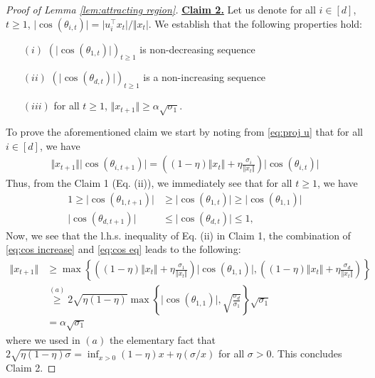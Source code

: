 \begin{proof}[Proof of Lemma \ref{lem:attracting region}]
\underline{\textbf{Claim 2.}} Let us denote for all $i \in [d]$, $t\ge 1$,  $\vert \cos(\theta_{i,t}) \vert  = \vert u_i^\top x_t \vert/ \Vert x_t \vert $. We establish that the following properties hold:
\begin{itemize}
    \item [$(i)$] $(\vert \cos(\theta_{1,t}) \vert)_{t \ge 1}$ is non-decreasing sequence
    \item [$(ii)$] $(\vert \cos(\theta_{d,t}) \vert)_{t \ge 1}$ is a non-increasing sequence
    \item [$(iii)$] for all $t\ge 1$, $\Vert x_{t+1}\Vert \ge \alpha \sqrt{\sigma_1}$.
\end{itemize}
To prove the aforementioned claim we start by noting from \eqref{eq:proj u} that for all $i \in [d]$, we have 
\begin{align}\label{eq:cos eq}
  \Vert x_{t+1} \Vert \vert \cos(\theta_{i, t+1}) \vert = \left((1- \eta) \Vert x_t \Vert + \eta \frac{\sigma_i}{\Vert x_t \Vert} \right)    \vert \cos(\theta_{i, t}) \vert
\end{align}
Thus, from the Claim 1 (Eq. (ii)), we immediately see that for all $t \ge 1$, we have  
\begin{align}
    1 \ge \vert \cos(\theta_{1, t+1}) \vert & \ge \vert \cos(\theta_{1, t}) \vert  \ge \vert \cos(\theta_{1, 1}) \vert  \label{eq:cos increase} \\
    \vert \cos(\theta_{d, t+1}) \vert & \le \vert \cos(\theta_{d, t}) \vert \le 1,
\end{align}
Now, we see that the l.h.s. inequality of Eq. (ii) in Claim 1, the combination of \eqref{eq:cos increase} and \eqref{eq:cos eq} leads to the following:
\begin{align}
    \Vert x_{t+1} \Vert & \ge \max\left\lbrace \left((1- \eta) \Vert x_t \Vert + \eta \frac{\sigma_1}{\Vert x_t \Vert} \right) \vert \cos(\theta_{1,1}) \vert, \left((1- \eta) \Vert x_t \Vert + \eta \frac{\sigma_d}{\Vert x_t \Vert} \right)   \right\rbrace  \\
    & \overset{(a)}{\ge} 2 \sqrt{\eta(1-\eta)}\max\left\lbrace      \vert \cos(\theta_{1,1}) \vert,  \sqrt{\frac{\sigma_d}{\sigma_1}}   \right\rbrace  \sqrt{\sigma_1} \\
    & = \alpha \sqrt{\sigma_1}
\end{align}
where we used in $(a)$ the elementary fact that $2\sqrt{\eta(1-\eta) \sigma } = \inf_{x > 0} (1-\eta) x + \eta(\sigma/x)$ for all $\sigma> 0$. This concludes Claim 2.

\medskip 


\end{proof}
